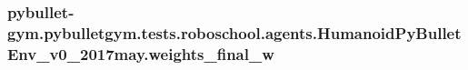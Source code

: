 \subsubsection[{\texorpdfstring{weights\+\_\+final\+\_\+w}{weights_final_w}}]{\setlength{\rightskip}{0pt plus 5cm}pybullet-\/gym.\+pybulletgym.\+tests.\+roboschool.\+agents.\+Humanoid\+Py\+Bullet\+Env\+\_\+v0\+\_\+2017may.\+weights\+\_\+final\+\_\+w}\hypertarget{namespacepybullet-gym_1_1pybulletgym_1_1tests_1_1roboschool_1_1agents_1_1_humanoid_py_bullet_env__v0__2017may_a097804d3fde56a6d85ce65e6d8c20e27}{}\label{namespacepybullet-gym_1_1pybulletgym_1_1tests_1_1roboschool_1_1agents_1_1_humanoid_py_bullet_env__v0__2017may_a097804d3fde56a6d85ce65e6d8c20e27}
